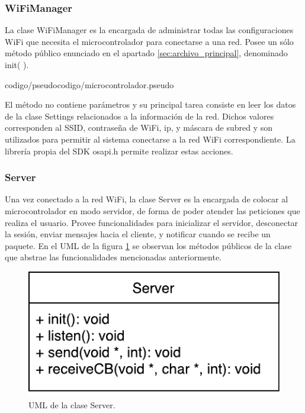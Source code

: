 \subsubsection{WiFiManager}

La clase WiFiManager es la encargada de administrar todas las configuraciones WiFi que necesita el microcontrolador para conectarse a una red.
Posee un sólo método público enunciado en el apartado \ref{sec:archivo_principal}, denominado init( ).

 {codigo/pseudocodigo/microcontrolador.pseudo}

El método no contiene parámetros y su principal tarea consiste en leer los datos de la clase Settings relacionados a la información de la red.
Dichos valores corresponden al SSID, contraseña de WiFi, ip, y máscara de subred y son utilizados para permitir al sistema conectarse a la red WiFi correspondiente.
La librería propia del SDK osapi.h permite realizar estas acciones.



\subsubsection{Server}

Una vez conectado a la red WiFi, la clase Server es la encargada de colocar al microcontrolador en modo servidor, de forma de poder atender las peticiones que realiza el usuario.
Provee funcionalidades para inicializar el servidor, desconectar la sesión, enviar mensajes hacia el cliente, y notificar cuando se recibe un paquete.
En el UML de la figura \ref{uml:server} se observan los métodos públicos de la clase que abstrae las funcionalidades mencionadas anteriormente.

\begin{figure}[!ht]
	\centering
	\includegraphics[scale=0.8]{imagenes/uml/server.pdf}
	\caption{UML de la clase Server.}
	\label{uml:server}
\end{figure}

